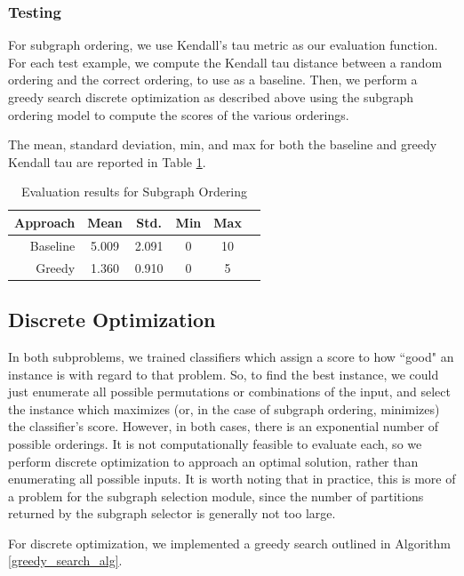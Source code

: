 \documentclass[12pt]{article}
\begin{document}
\subsubsection{Testing}

For subgraph ordering, we use Kendall's tau metric as our evaluation function.
For each test example, we compute the Kendall tau distance between a random
ordering and the correct ordering, to use as a baseline. Then, we perform a
greedy search discrete optimization as described above using the subgraph
ordering model to compute the scores of the various orderings.

The mean, standard deviation, min, and max for both the baseline and greedy
Kendall tau are reported in Table \ref{tab:order_eval}.

\begin{table}
\centering
\begin{tabular}{|r|c|c|c|c|c|}
\hline
Approach & Mean  & Std.  & Min & Max \\ \hline\hline
Baseline & 5.009 & 2.091 & 0   & 10  \\ \hline
Greedy   & 1.360 & 0.910 & 0   & 5   \\ \hline
\end{tabular}
\label{tab:order_eval}
\caption{Evaluation results for Subgraph Ordering}
\end{table}


\subsection{Discrete Optimization}

In both subproblems, we trained classifiers which assign a score to how ``good"
an instance is with regard to that problem. So, to find the best instance, we
could just enumerate all possible permutations or combinations of the input,
and select the instance which maximizes (or, in the case of subgraph ordering,
minimizes) the classifier's score. However, in both cases, there is an exponential number of possible orderings.
It is not computationally feasible to evaluate each, so we
perform discrete optimization to approach an optimal solution, rather than
enumerating all possible inputs. It is worth noting that in practice, this is
more of a problem for the subgraph selection module, since the number of partitions
returned by the subgraph selector is generally not too large.

For discrete optimization, we implemented a greedy search outlined in Algorithm \ref{greedy_search_alg}.
\end{document}

